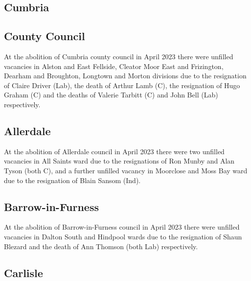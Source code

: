 \documentclass[a4paper,openany]{book}
\begin{document}
\begin{resultsiii}
\section{Cumbria}

\subsection*{County Council}

At the abolition of Cumbria county council in April 2023 there were unfilled vacancies in Alston and East Fellside, Cleator Moor East and Frizington, Dearham and Broughton, Longtown and Morton divisions due to the resignation of Claire Driver (Lab), the death of Arthur Lamb (C), the resignation of Hugo Graham (C) and the deaths of Valerie Tarbitt (C) and John Bell (Lab) respectively.%
%
%
%
%

\subsection*{Allerdale}

At the abolition of Allerdale council in April 2023 there were two unfilled vacancies in All Saints ward due to the resignations of Ron Munby and Alan Tyson (both C), and a further unfilled vacancy in Moorclose and Moss Bay ward due to the resignation of Blain Sansom (Ind).%
%

\subsection*{Barrow-in-Furness}

At the abolition of Barrow-in-Furness council in April 2023 there were unfilled vacancies in Dalton South and Hindpool wards due to the resignation of Shaun Blezard and the death of Ann Thomson (both Lab) respectively.%
%

\subsection*{Carlisle}


\end{resultsiii}
\end{document}
